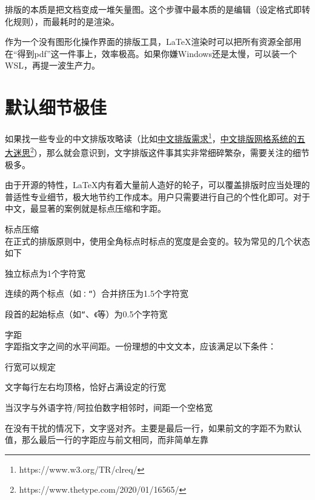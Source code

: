\documentclass[10pt,openany]{book}
\begin{document}
排版的本质是把文档变成一堆矢量图。这个步骤中最本质的是编辑（设定格式即转化规则），而最耗时的是渲染。

作为一个没有图形化操作界面的排版工具，\LaTeX 渲染时可以把所有资源全部用在“得到pdf”这一件事上，效率极高。如果你嫌Windows还是太慢，可以装一个WSL，再提一波生产力。

\section{默认细节极佳}

如果找一些专业的中文排版攻略读（比如\href{https://www.w3.org/TR/clreq/}{中文排版需求\footnote{https://www.w3.org/TR/clreq/}}，\href{https://www.thetype.com/2020/01/16565/}{中文排版网格系统的五大迷思\footnote{https://www.thetype.com/2020/01/16565/}}），那么就会意识到，文字排版这件事其实非常细碎繁杂，需要关注的细节极多。

由于开源的特性，\LaTeX 内有着大量前人造好的轮子，可以覆盖排版时应当处理的普适性专业细节，极大地节约工作成本。用户只需要进行自己的个性化即可。对于中文，最显著的案例就是标点压缩和字距。

\begin{tightitem}
    \item 标点压缩\\在正式的排版原则中，使用全角标点时标点的宽度是会变的。较为常见的几个状态如下
    \begin{tightenum}
        \item 独立标点为1个字符宽
        \item 连续的两个标点（如\texttt{：“}）合并挤压为1.5个字符宽
        \item 段首的起始标点（如\texttt{“}、\texttt{《}等）为0.5个字符宽
    \end{tightenum}
    \item 字距\\字距指文字之间的水平间距。一份理想的中文文本，应该满足以下条件：
    \begin{tightenum}
        \item 行宽可以规定
        \item 文字每行左右均顶格，恰好占满设定的行宽
        \item 当汉字与外语字符/阿拉伯数字相邻时，间距一个空格宽
        \item 在没有干扰的情况下，文字竖对齐。主要是最后一行，如果前文的字距不为默认值，那么最后一行的字距应与前文相同，而非简单左靠
    \end{tightenum}
\end{tightitem}
\end{document}
